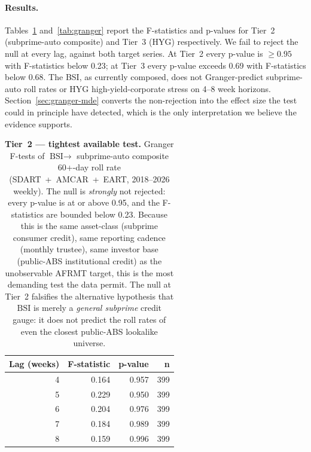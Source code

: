 \documentclass[11pt,letterpaper]{article}
\newcommand{\bsi}{\text{BSI}}
\begin{document}
\paragraph{Results.}
Tables~\ref{tab:granger-t2} and~\ref{tab:granger} report the
F-statistics and p-values for Tier~2 (subprime-auto composite) and
Tier~3 (HYG) respectively. We fail to reject the null at every lag,
against both target series. At Tier~2 every p-value is $\ge 0.95$ with
F-statistics below 0.23; at Tier~3 every p-value exceeds 0.69 with
F-statistics below 0.68. The BSI, as currently composed, does not
Granger-predict subprime-auto roll rates or HYG high-yield-corporate
stress on 4--8 week horizons. Section~\ref{sec:granger-mde} converts
the non-rejection into the effect size the test could in principle
have detected, which is the only interpretation we believe the
evidence supports.

\begin{table}[H]
\centering
\small
\begin{tabular}{rrrr}
\toprule
\textbf{Lag (weeks)} & \textbf{F-statistic} & \textbf{p-value} & \textbf{n} \\
\midrule
4 & 0.164 & 0.957 & 399 \\
5 & 0.229 & 0.950 & 399 \\
6 & 0.204 & 0.976 & 399 \\
7 & 0.184 & 0.989 & 399 \\
8 & 0.159 & 0.996 & 399 \\
\bottomrule
\end{tabular}
\caption{\textbf{Tier~2 --- tightest available test.} Granger F-tests
of $\bsi \rightarrow $ subprime-auto composite 60+-day roll rate
(SDART~+~AMCAR~+~EART, 2018--2026 weekly). The null is \emph{strongly}
not rejected: every p-value is at or above 0.95, and the F-statistics
are bounded below 0.23. Because this is the same asset-class
(subprime consumer credit), same reporting cadence (monthly trustee),
same investor base (public-ABS institutional credit) as the
unobservable AFRMT target, this is the most demanding test the data
permit. The null at Tier~2 falsifies the alternative hypothesis that
$\bsi$ is merely a \emph{general subprime} credit gauge: it does not
predict the roll rates of even the closest public-ABS lookalike
universe.}
\label{tab:granger-t2}
\end{table}
\end{document}
